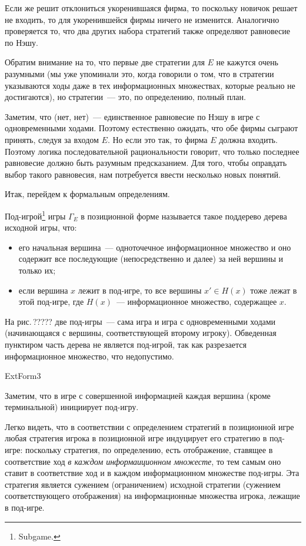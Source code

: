 Если же решит отклониться укоренившаяся фирма, то поскольку новичок
решает не входить, то для укоренившейся фирмы ничего не изменится.
Аналогично проверяется то, что два других набора стратегий также
определяют равновесие по Нэшу.

Обратим внимание на то, что первые две стратегии для $E$ не кажутся
очень разумными (мы уже упоминали это, когда говорили о том, что
в стратегии указываются ходы даже в тех информационных множествах,
которые реально не достигаются), но стратегии~--- это, по определению,
полный план.

Заметим, что (нет, нет)~--- единственное равновесие по Нэшу в игре с
одновременными ходами. Поэтому естественно ожидать, что обе фирмы
сыграют принять, следуя за входом $E$. Но если это так, то
фирма  $E$ должна входить. Поэтому логика последовательной рациональности
говорит, что только последнее равновесие должно быть разумным
предсказанием. Для того, чтобы оправдать выбор такого равновесия,
нам потребуется ввести несколько новых понятий.

Итак, перейдем к формальным определениям.

\begin{definition}
Под-игрой\footnote{ Subgame.} игры $\Gamma_E$ в позиционной форме
называется такое поддерево дерева исходной игры, что:
\begin{itemize}
\item[(1)] его начальная вершина~--- одноточечное информационное
множество и оно содержит все последующие (непосредственно и далее)
за ней вершины и только их;

\item[(2)] если вершина $x$ лежит в под-игре, то все вершины $x'\in
H(x)$ тоже лежат в этой под-игре, где $H(x)$~--- информационное
множество, содержащее $x$.
\end{itemize}
\end{definition}

На рис.\,????? две под-игры~--- сама игра и игра с одновременными
ходами (начинающаяся с вершины, соответствующей второму игроку). Обведенная пунктиром
часть дерева не является под-игрой, так
как разрезается информационное множество, что недопустимо.


ExtForm3



Заметим, что в игре с совершенной информацией каждая вершина (кроме
терминальной) инициирует под-игру.

Легко видеть, что в соответствии с определением стратегий в
позиционной игре любая стратегия игрока в позиционной игре
индуцирует его стратегию в под-игре: поскольку стратегия, по
определению, есть отображение, ставящее в соответствие ход \emph{
в каждом информаиционном множесте}, то тем самым оно ставит
в соответствие ход и в каждом информационном множестве под-игры.
Эта стратегия является сужением
(ограничением) исходной стратегии (сужением соответствующего
отображения) на информационные множества игрока, лежащие в
под-игре.

